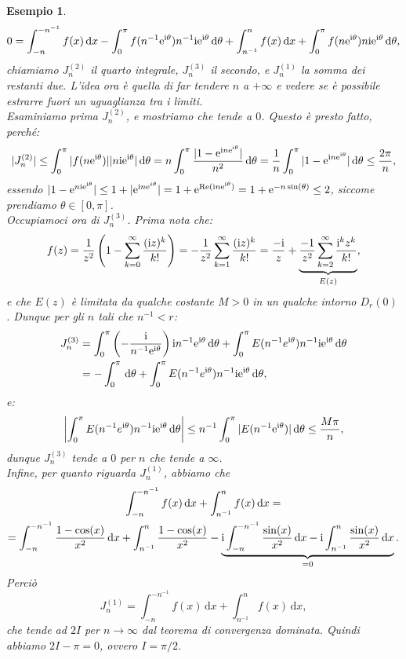 \documentclass[11pt]{book}
\theoremstyle{Definizione}
\theoremstyle{TeoremaProposizioneLemmaCorollarioCongettura}
\theoremstyle{OsservazioneNotaEsempio}
\newtheorem{myes}{Esempio}[section]
\newcommand{\Disc}[3][]{D^{#1}_{{#2}}({#3})}
\renewcommand{\Re}{\textup{Re}}
\renewcommand{\i}{\textup{i}}
\newcommand{\e}{\textup{e}}
\renewcommand{\d}{\mathrm{d}}
\newcommand{\dx}{\,\d x}
\newcommand{\dtheta}{\, \d \theta}
\begin{document}
\begin{myes}
$$
0 = \int_{-n}^{-n^{-1}} f(x)\dx  - \int_{0}^{\pi} f(n^{-1}\e^{\i \theta}) n^{-1}\i\e^{\i\theta}\dtheta + \int_{n^{-1}}^{n} f(x)\dx + \int_{0}^{\pi} f(n\e^{\i\theta}) n \i \e^{\i\theta} \dtheta,
$$
chiamiamo $J_n^{(2)}$ il quarto integrale, $J_n^{(3)}$ il secondo, e $J_n^{(1)}$ la somma dei restanti due. L'idea ora è quella di far tendere $n$ a $+\infty$ e vedere se è possibile estrarre fuori un uguaglianza tra i limiti.\\
Esaminiamo prima $J_n^{(2)}$, e mostriamo che tende a $0$. Questo è presto fatto, perché:
$$
|J_n^{(2)}| \leq \int_{0}^{\pi} |f(n\e^{\i\theta}) ||n\i\e^{\i\theta}|\dtheta = n \int_{0}^{\pi} \frac{|1-\e^{\i n\e^{\i\theta}}|}{n^2}\dtheta = \frac{1}{n}\int_{0}^{\pi} |1-\e^{\i n\e^{\i\theta}}|\dtheta \leq \frac{2\pi}{n},
$$
essendo $ |1-\e^{n\i\e^{\i\theta}}| \leq 1 + |\e^{\i n \e^{i\theta}}| = 1+ \e^{\Re(\i n \e^{\i\theta})} = 1+ \e^{-n \sin(\theta)} \leq 2$, siccome prendiamo $\theta\in [0,\pi]$.\\
Occupiamoci ora di $J_n^{(3)}$. Prima nota che:
$$
f(z) = \frac{1}{z^2}\left(1-\sum_{k = 0}^\infty \frac{(\i z)^k}{k!}\right) = -\frac{1}{z^2}\sum_{k = 1}^\infty \frac{(\i z)^k}{k!} = \frac{-\i }{z}+\underbrace{\frac{-1}{z^2}\sum_{k = 2}^\infty \frac{\i^k z^k}{k!}}_{E(z)},
$$
e che $E(z)$ è limitata da qualche costante $M > 0$ in un qualche intorno $\Disc{r}{0}$. Dunque per gli $n$ tali che $n^{-1} < r$:
\begin{align*}
J_n^{(3)} &= \int_0^{\pi} \left(-\frac{\i}{n^{-1}\e^{\i\theta}}\right)\i n^{-1}\e^{\i\theta}\dtheta + \int_{0}^\pi E(n^{-1}e^{\i\theta}) n^{-1}\i\e^{\i\theta}\dtheta\\
&= -\int_{0}^\pi \dtheta + \int_{0}^\pi E(n^{-1}e^{\i\theta}) n^{-1}\i\e^{\i\theta}\dtheta,
\end{align*}
e:
$$
\left|\int_{0}^\pi E(n^{-1}e^{\i\theta}) n^{-1}\i\e^{\i\theta}\dtheta\right| \leq n^{-1}\int_{0}^\pi |E(n^{-1}\e^{\i\theta})| \dtheta  \leq \frac{M\pi}{n},
$$
dunque $J_n^{(3)}$ tende a $0$ per $n$ che tende a $\infty$.\\
Infine, per quanto riguarda $J_n^{(1)}$, abbiamo che
\begin{multline*}
\int_{-n}^{-n^{-1}} f(x)\dx + \int_{n^{-1}}^{n} f(x)\dx = \\
= \int_{-n}^{-n^{-1}} \frac{1-\cos(x)}{x^2}\dx + \int_{n^{-1}}^{n} \frac{1-\cos(x)}{x^2} - \underbrace{\i \int_{-n}^{-n^{-1}} \frac{\sin(x)}{x^2}\dx -\i \int_{n^{-1}}^{n} \frac{\sin(x)}{x^2}\dx}_{ = 0}.
\end{multline*}
Perciò
$$
J_n^{(1)} = \int_{-n}^{-n^{-1}} f(x)\dx + \int_{n^{-1}}^{n} f(x)\dx,
$$
che tende ad $2I$ per $n\to \infty$ dal teorema di convergenza dominata. Quindi abbiamo $2I -\pi = 0$, ovvero $I = \pi/2$.
\end{myes}
\end{document}
